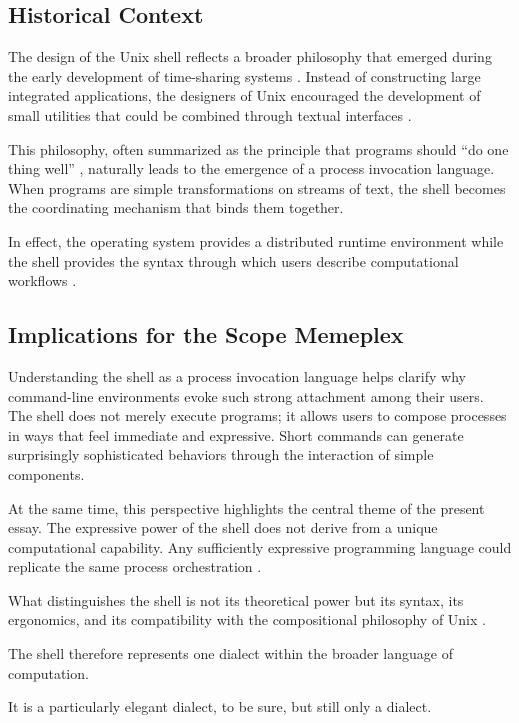 \documentclass[12pt]{article}
\theoremstyle{definition}
\begin{document}
\subsection{Historical Context}

The design of the Unix shell reflects a broader philosophy that emerged
during the early development of time-sharing systems \cite{ritchie1974}.
Instead of constructing large integrated applications, the designers of
Unix encouraged the development of small utilities that could be
combined through textual interfaces \cite{mcilroy1978,kernighan1978}.

This philosophy, often summarized as the principle that programs should
``do one thing well'' \cite{raymond2003}, naturally leads to the emergence
of a process invocation language. When programs are simple
transformations on streams of text, the shell becomes the coordinating
mechanism that binds them together.

In effect, the operating system provides a distributed runtime
environment while the shell provides the syntax through which users
describe computational workflows \cite{hoare1985}.

\subsection{Implications for the Scope Memeplex}

Understanding the shell as a process invocation language helps clarify
why command-line environments evoke such strong attachment among their
users. The shell does not merely execute programs; it allows users to
compose processes in ways that feel immediate and expressive. Short
commands can generate surprisingly sophisticated behaviors through the
interaction of simple components.

At the same time, this perspective highlights the central theme of the
present essay. The expressive power of the shell does not derive from a
unique computational capability. Any sufficiently expressive programming
language could replicate the same process orchestration \cite{kleene1952}.

What distinguishes the shell is not its theoretical power but its
syntax, its ergonomics, and its compatibility with the compositional
philosophy of Unix \cite{raymond2003}.

The shell therefore represents one dialect within the broader language
of computation.

It is a particularly elegant dialect, to be sure, but still only a
dialect.
\end{document}
